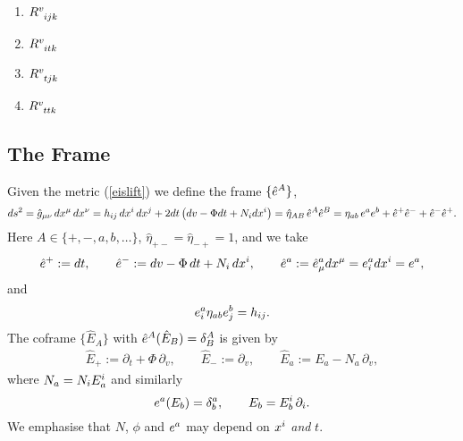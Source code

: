 \documentclass{article}
\begin{document}
\begin{enumerate}
	\item $R\indices{^v_i_j_k}$
	\item $R\indices{^v_i_t_k}$
	\item $R\indices{^v_t_j_k}$
	\item $R\indices{^v_t_t_k}$
\end{enumerate}

	 
\subsection{The Frame}
Given the metric (\ref{eislift}) we define the frame $\{ {\hat e}\sp{A}\}$,
\begin{equation*}
	ds^2=\hat g_{\mu\nu}\,dx\sp{\mu}\,dx\sp{\nu}
	=h_{ij}\, dx\sp{i}\, dx\sp{j}+2dt \left( dv-\Phi dt+N_i dx\sp{i}\right)
	= {\hat \eta}_{AB}\, {\hat e}\sp{A} {\hat e}\sp{B}
	= \eta_{ab}\, e\sp{a} e\sp{b}+  {\hat e}\sp{+} {\hat e}\sp{-} +  {\hat e}\sp{-} {\hat e}\sp{+}.
\end{equation*}
Here $A\in \{+,-,a,b,\ldots\}$, $ {\hat \eta}_{+-}={\hat \eta}_{-+}=1$, and we take
\begin{align*}
	{\hat e}\sp{+}:= dt,\qquad
	{\hat e}\sp{-} :=dv-\Phi\,dt +N_i\,dx\sp{i},\qquad
	{\hat e}\sp{a} := {\hat e}\sp{a}_{\mu} dx\sp{\mu}= { e}\sp{a}_{i} dx\sp{i}= { e}\sp{a},
\end{align*}
and 
$$e\sp{a}_i \eta_{ab} e\sp{b}_j =h_{ij}.$$
The coframe  $\{ {\hat E}_{A}\}$ with ${\hat e}\sp{A}(  {\hat E}_{B})=\delta\sp{A}_B$ is given by
\begin{align*}
	{\hat E}_{+}:= \partial_t +\Phi\,\partial_v,\qquad
	{\hat E}_{-} :=\partial_v,\qquad
	{\hat E}_{a} := {E}_{a}- N_a\,\partial_v,
\end{align*}
where $N_a=N_i E_a\sp{i}$ and similarly
$$ { e}\sp{a}(  { E}_{b})=\delta\sp{a}_b,\qquad { E}_{b}={ E}_{b}\sp{i}\,\partial_i.
$$
We emphasise that $N$, $\phi$ and $e\sp{a}$ may depend on $x\sp{i}$ \emph{and} $t$.
\end{document}
